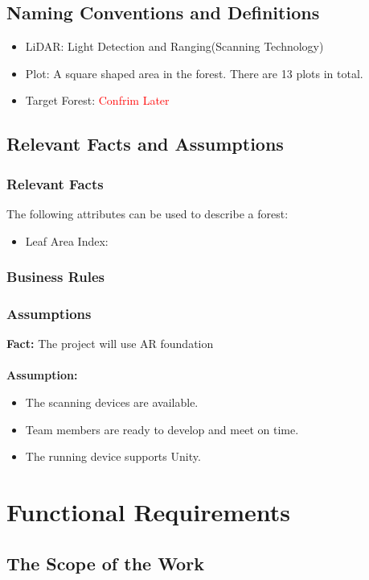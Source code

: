 \documentclass{article}
\begin{document}
\subsection{Naming Conventions and Definitions}
\begin{itemize}
    \item LiDAR: Light Detection and Ranging(Scanning Technology)
    \item Plot: A square shaped area in the forest. There are 13 plots in total. 
    \item Target Forest: \textcolor{red}{Confrim Later}
\end{itemize}

\subsection{Relevant Facts and Assumptions}
\subsubsection{Relevant Facts}
The following attributes can be used to describe a forest:
\begin{itemize}
    \item Leaf Area Index:
\end{itemize}
\subsubsection{Business Rules}
\subsubsection{Assumptions}
\textbf{Fact:} The project will use AR foundation\\\\
\textbf{Assumption:}
\begin{itemize}
    \item The scanning devices are available.
    \item Team members are ready to develop and meet on time.
    \item The running device supports Unity.
\end{itemize}


\section{Functional Requirements}
\subsection{The Scope of the Work}
\end{document}
